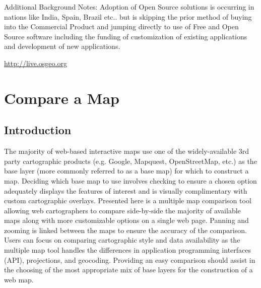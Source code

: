 \documentclass[12pt,letterpaper]{article}
\begin{document}
Additional Background Notes: Adoption of Open Source solutions is occurring in nations like India, Spain, Brazil etc.. but is skipping the prior method of buying into the Commercial Product and jumping directly to use of Free and Open Source software including the funding of customization of existing applications and development of new applications.

\url{http://live.osgeo.org}

\section{Compare a Map}
\subsection{Introduction}
The majority of web-based interactive maps use one of the widely-available 3rd party cartographic products (e.g. Google, Mapquest, OpenStreetMap, etc.) as the base layer (more commonly referred to as a base map) for which to construct a map. Deciding which base map to use involves checking to ensure a chosen option adequately displays the features of interest and is visually complimentary with custom cartographic overlays.  Presented here is a multiple map comparison tool allowing web cartographers to compare side-by-side the majority of available maps along with more customizable options on a single web page. Panning and zooming is linked between the maps to ensure the accuracy of the comparison. Users can focus on comparing cartographic style and data availability as the multiple map tool handles the differences in application programming interfaces (API), projections, and geocoding.  Providing an easy comparison should assist in the choosing of the most appropriate mix of base layers for the construction of a web map.
\end{document}
